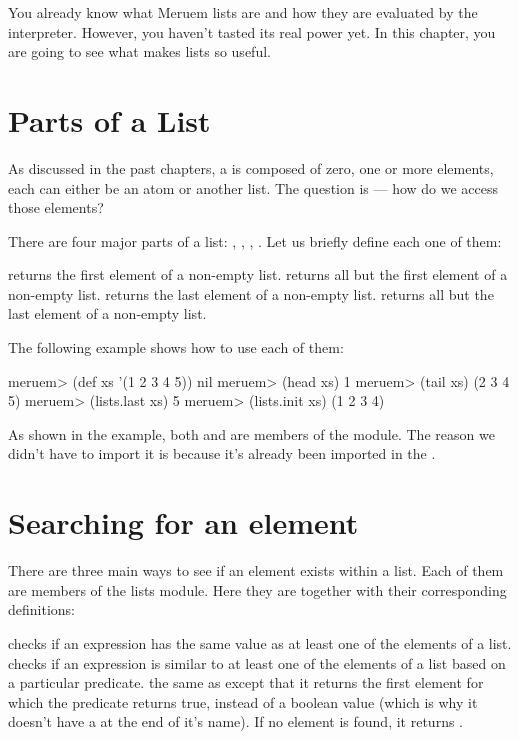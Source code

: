 You already know what Meruem lists are and how they are evaluated by the interpreter. However, you haven't tasted its real power yet. In this chapter, you are going to see what makes lists so useful.

\section{Parts of a List}
As discussed in the past chapters, a  is composed of zero, one or more elements, each can either be an atom or another list. The question is --- how do we access those elements? 

There are four major parts of a list: , , , . Let us briefly define each one of them:

\begin{description}
	 returns the first element of a non-empty list.
	 returns all but the first element of a non-empty list.
	 returns the last element of a non-empty list.
	 returns all but the last element of a non-empty list.
\end{description}

The following example shows how to use each of them:

\begin{REPL}
meruem> (def xs '(1 2 3 4 5))
nil
meruem> (head xs)
1
meruem> (tail xs)
(2 3 4 5)
meruem> (lists.last xs)
5
meruem> (lists.init xs)
(1 2 3 4)
\end{REPL}

As shown in the example, both  and  are members of the  module. The reason we didn't have to import it is because it's already been imported in the .

\section{Searching for an element}
There are three main ways to see if an element exists within a list. Each of them are members of the lists module. Here they are together with their corresponding definitions:

\begin{description}
	 checks if an expression has the same value as at least one of the elements of a list.
	 checks if an expression is similar to at least one of the elements of a list based on a particular predicate.
	 the same as  except that it returns the first element for which the predicate returns true, instead of a boolean value (which is why it doesn't have a  at the end of it's name). If no element is found, it returns .
\end{description}

